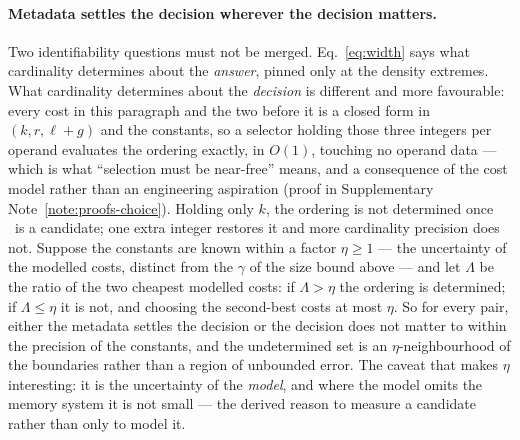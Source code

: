 \paragraph*{Metadata settles the decision wherever the decision matters.}
Two identifiability questions must not be merged. Eq.~\eqref{eq:width} says what cardinality
determines about the \emph{answer}, pinned only at the density extremes. What cardinality determines
about the \emph{decision} is different and more favourable: every cost in this paragraph and the two
before it is a closed form in $(k,r,\ell+g)$ and the constants, so a selector holding those three
integers per operand evaluates the ordering exactly, in $O(1)$, touching no operand data --- which is
what ``selection must be near-free'' means, and a consequence of the cost model rather than an
engineering aspiration (proof in Supplementary Note~\ref{note:proofs-choice}). Holding only $k$, the ordering is not
determined once \rR\ is a candidate; one extra integer restores it and more cardinality precision does
not. Suppose the constants are known within a factor $\eta\ge1$ --- the uncertainty of the modelled
costs, distinct from the $\gamma$ of the size bound above --- and let $\Lambda$ be the ratio of the two
cheapest modelled costs: if $\Lambda>\eta$ the ordering is determined; if $\Lambda\le\eta$ it is
not, and choosing the second-best costs at most $\eta$. So for every pair, either the metadata
settles the decision or the decision does not matter to within the precision of the constants, and the
undetermined set is an $\eta$-neighbourhood of the boundaries rather than a region of unbounded error.
The caveat that makes $\eta$ interesting: it is the uncertainty of the \emph{model}, and where the
model omits the memory system it is not small --- the derived reason to measure a candidate rather than
only to model it.

